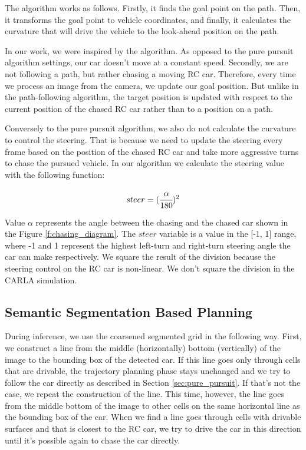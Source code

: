 \documentclass{ctuthesis/ctuthesis}
\begin{document}
The algorithm works as follows. Firstly, it finds the goal point on the path. Then, it transforms the goal point to vehicle coordinates, and finally, it calculates the curvature that will drive the vehicle to the look-ahead position on the path. \par


In our work, we were inspired by the algorithm. As opposed to the pure pursuit algorithm settings, our car doesn't move at a constant speed. Secondly, we are not following a path, but rather chasing a moving RC car. Therefore, every time we process an image from the camera, we update our goal position. But unlike in the path-following algorithm, the target position is updated with respect to the current position of the chased RC car rather than to a position on a path. \par
Conversely to the pure pursuit algorithm, we also do not calculate the curvature to control the steering. That is because we need to update the steering every frame based on the position of the chased RC car and take more aggressive turns to chase the pursued vehicle. In our algorithm we calculate the steering value with the following function:

\begin{equation}steer = (\cfrac{\alpha}{\textrm{180}})^{2}\end{equation}

Value $\alpha$ represents the angle between the chasing and the chased car shown in the Figure \ref{f:chasing_diagram}. The $steer$ variable is a value in the [-1, 1] range, where -1 and 1 represent the highest left-turn and right-turn steering angle the car can make respectively. We square the result of the division because the steering control on the RC car is non-linear. We don't square the division in the CARLA simulation.




\subsection{Semantic Segmentation Based Planning}
During inference, we use the coarsened segmented grid in the following way. First, we construct a line from the middle (horizontally) bottom (vertically) of the image to the bounding box of the detected car. If this line goes only through cells that are drivable, the trajectory planning phase stays unchanged and we try to follow the car directly as described in Section \ref{sec:pure_pursuit}. If that's not the case, we repeat the construction of the line. This time, however, the line goes from the middle bottom of the image to other cells on the same horizontal line as the bounding box of the car. When we find a line goes through cells with drivable surfaces and that is closest to the RC car, we try to drive the car in this direction until it's possible again to chase the car directly.
\end{document}
